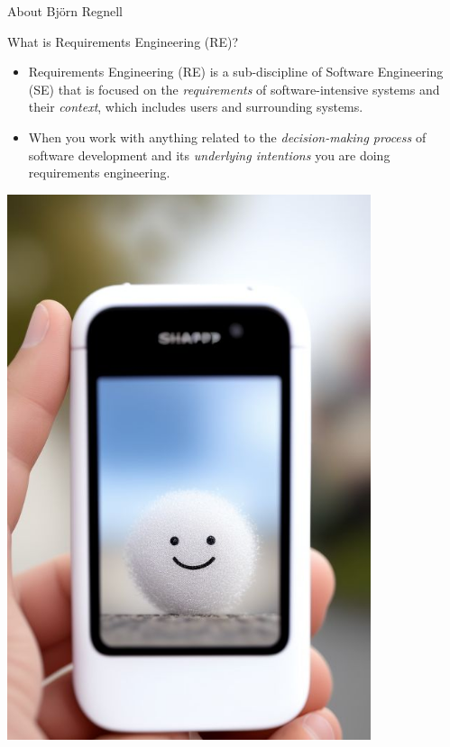 \documentclass{beamer}
\begin{document}
\begin{frame}[fragile]{About Björn Regnell}
\begin{minipage}[t][1.0\textheight]{0.22\textwidth}
\end{minipage}%
\end{frame}

\begin{frame}[fragile]{What is Requirements Engineering (RE)?}
\begin{minipage}[t]{0.6\textwidth}
\vspace{0pt}
\begin{itemize}
\item  Requirements Engineering (RE) is a sub-discipline of Software Engineering (SE) that is focused on the \textit{requirements} of software-intensive systems and their \textit{context}, which includes users and surrounding systems.
\item When you work with anything related to the \textit{decision-making process} of software development and its \emph{underlying intentions} you are doing requirements engineering.
\end{itemize}
\end{minipage}%
\begin{minipage}[t]{0.4\textwidth}
\vspace{0pt}\hfill\includegraphics[width=0.8\textwidth]{img/happy-mobile}
\end{minipage}%
\end{frame}
\end{document}
